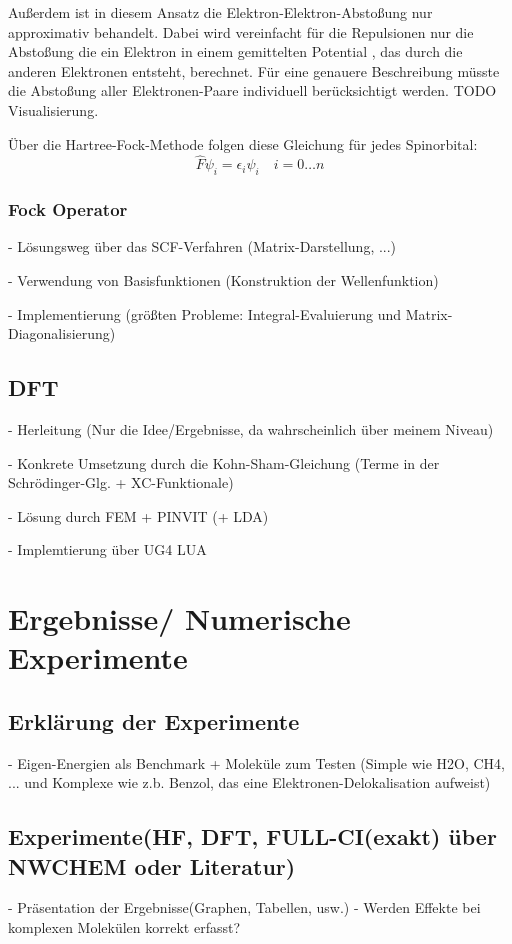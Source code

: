 \documentclass[a4paper, 12pt]{report}
\begin{document}
Außerdem ist in diesem Ansatz die Elektron-Elektron-Abstoßung nur approximativ behandelt.
Dabei wird vereinfacht für die Repulsionen nur die Abstoßung die ein Elektron in einem gemittelten Potential
, das durch die anderen Elektronen entsteht, berechnet.
Für eine genauere Beschreibung müsste die Abstoßung aller Elektronen-Paare individuell berücksichtigt werden.
TODO Visualisierung.

Über die Hartree-Fock-Methode folgen diese Gleichung für jedes Spinorbital:
\begin{equation}
  \hat{F} \psi_i = \epsilon_i \psi_i \quad i = 0 \dots n
\end{equation}

\subsection{Fock Operator}


- Lösungsweg über das SCF-Verfahren (Matrix-Darstellung, ...)

- Verwendung von Basisfunktionen (Konstruktion der Wellenfunktion)

- Implementierung (größten Probleme: Integral-Evaluierung und
Matrix-Diagonalisierung)

\section{DFT}
- Herleitung (Nur die Idee/Ergebnisse, da wahrscheinlich über
meinem Niveau)

- Konkrete Umsetzung durch die Kohn-Sham-Gleichung (Terme in der
Schrödinger-Glg. + XC-Funktionale)

- Lösung durch FEM + PINVIT (+ LDA)

- Implemtierung über UG4 LUA

\chapter{Ergebnisse/ Numerische Experimente}
\section{Erklärung der Experimente}
- Eigen-Energien als Benchmark + Moleküle zum Testen (Simple wie
H2O, CH4, ... und Komplexe wie z.b. Benzol, das eine
Elektronen-Delokalisation aufweist)

\section{Experimente(HF, DFT, FULL-CI(exakt) über NWCHEM oder Literatur)}
- Präsentation der Ergebnisse(Graphen, Tabellen, usw.)
- Werden Effekte bei komplexen Molekülen korrekt erfasst?
\end{document}
